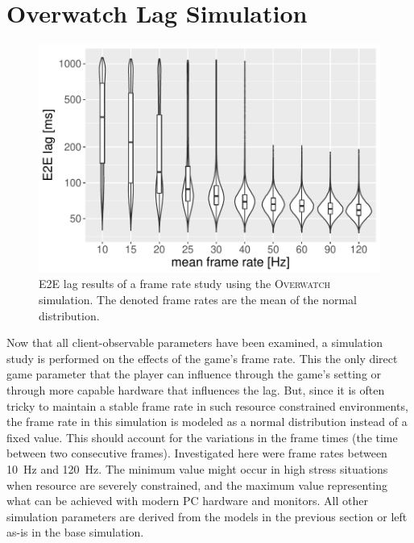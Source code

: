 \section{Overwatch Lag Simulation}
\label{sec:simulation}

\begin{figure}
	\centering
	\includegraphics[width=1.0\columnwidth]{images/lagsim.pdf}
	\caption{\acrshort{E2E} lag results of a frame rate study using the \textsc{Overwatch} simulation. The denoted frame rates are the mean of the normal distribution.}
\label{fig:lagsim}
\end{figure}


Now that all client-observable parameters have been examined, a simulation study is performed on the effects of the game's frame rate. This the only direct game parameter that the player can influence through the game's setting or through more capable hardware that influences the lag. But, since it is often tricky to maintain a stable frame rate in such resource constrained environments, the frame rate in this simulation is modeled as a normal distribution instead of a fixed value. This should account for the variations in the frame times (the time between two consecutive frames). Investigated here were frame rates between \SI{10}{\hertz} and \SI{120}{\hertz}. The minimum value might occur in high stress situations when resource are severely constrained, and the maximum value representing what can be achieved with modern PC hardware and monitors. All other simulation parameters are derived from the models in the previous section or left as-is in the base simulation. 

